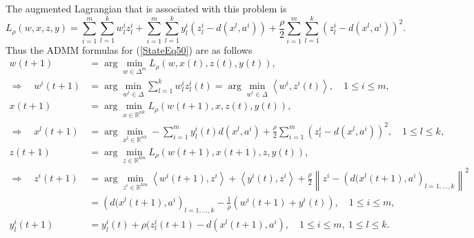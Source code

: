 \documentclass[11pt]{article}
\numberwithin{equation}{section}
\begin{document}
The augmented Lagrangian that is associated with this problem is 
\begin{equation}
	L_{\rho}(w,x,z,y) = \sum\limits_{i=1}^{m} \sum\limits_{l=1}^{k} w^i_l z^i_l + \sum\limits_{i=1}^{m} \sum\limits_{l=1}^{k} y^i_l (z^i_l - d(x^l,a^i)) + \frac{\rho}{2} \sum\limits_{i=1}^{m} \sum\limits_{l=1}^{k} \left(z^i_l - d(x^l,a^i)\right)^2 . \label{StateEq50}
\end{equation}
Thus the ADMM formulas for (\ref{StateEq50}) are as follows
\begin{equation*}
\begin{split}
	w(t+1) &= \arg\min\limits_{w \in \Delta^m} L_{\rho}(w,x(t),z(t),y(t)), \\
	\Rightarrow \quad w^i(t+1) &= \arg\min\limits_{w^i \in \Delta} \sum\limits_{l=1}^{k} w^i_l z^i_l(t) = \arg\min\limits_{w^i \in \Delta} \left\langle w^i, z^i(t) \right\rangle, \quad 1 \leq i \leq m , \\
	x(t+1) &= \arg\min\limits_{x \in \mathbb{R}^{nk}} L_{\rho}(w(t+1),x,z(t),y(t)), \\
	\Rightarrow \quad x^l(t+1) &= \arg\min\limits_{x^l \in \mathbb{R}^{nk}} -\sum\limits_{i=1}^{m} y^i_l(t) d(x^l, a^i) + \frac{\rho}{2} \sum\limits_{i=1}^{m} \left(z^i_l - d(x^l,a^i)\right)^2, \quad 1 \leq l \leq k , \\
	z(t+1) &= \arg\min\limits_{z \in \mathbb{R}^{km}} L_{\rho}(w(t+1),x(t+1),z,y(t)), \\
	\Rightarrow \quad z^i(t+1) &= \arg\min\limits_{z^i \in \mathbb{R}^{km}} \left\langle w^i(t+1), z^i \right\rangle +  \left\langle y^i(t), z^i \right\rangle + \frac{\rho}{2} \left\lVert z^i - \left( d(x^l(t+1), a^i \right)_{l=1, \ldots , k} \right\lVert^2 \\
	&= \left(d(x^l(t+1), a^i \right)_{l=1, \ldots , k} - \frac{1}{\rho}\left( w^i(t+1) + y^i(t) \right), \quad 1 \leq i \leq m, \\
	y^i_l(t+1) &= y^i_l(t) + \rho (z^i_l(t+1) - d(x^l(t+1), a^i), \quad 1 \leq i \leq m, \: 1 \leq l \leq k.
\end{split}
\end{equation*}


\end{document}
